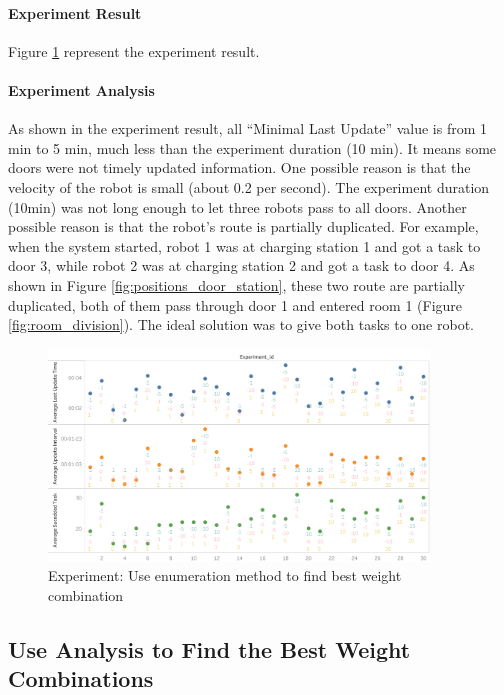 \paragraph{Experiment Result} 
Figure \ref{fig:gather_info_experiment_enumerate} represent the experiment result.

\paragraph{Experiment Analysis} 

As shown in the experiment result, all ``Minimal Last Update'' value is from 1 min to 5 min, much less than the experiment duration (10 min). It means some doors were not timely updated information. One possible reason is that the velocity of the robot is small (about 0.2 per second). The experiment duration (10min) was not long enough to let three robots pass to all doors. Another possible reason is that the robot's route is partially duplicated. For example, when the system started, robot 1 was at charging station 1 and got a task to door 3, while robot 2 was at charging station 2 and got a task to door 4. As shown in Figure \ref{fig:positions_door_station}, these two route are partially duplicated, both of them pass through door 1 and entered room 1 (Figure \ref{fig:room_division}). The ideal solution was to give both tasks to one robot. 

\begin{figure}[htbp]
 \centering
 \includegraphics[width = 0.9\textwidth]{content/images/ch5/gather_info_enumerate.png}
 \caption{Experiment: Use enumeration method to find best weight combination}
 \label{fig:gather_info_experiment_enumerate}
\end{figure}


\subsection{Use Analysis to Find the Best Weight Combinations}


